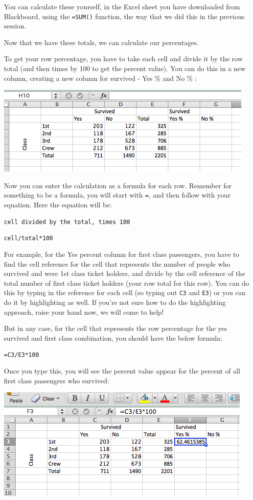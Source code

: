 \documentclass[
]{book}
\begin{document}
You can calculate these yourself, in the Excel sheet you have downloaded from Blackboard, using the \texttt{=SUM()} function, the way that we did this in the previous session.

Now that we have these totals, we can calculate our percentages.

To get your row percentage, you have to take each cell and divide it by the row total (and then times by 100 to get the percent value). You can do this in a new column, creating a new column for survived - Yes \% and No \% :

\includegraphics{imgs/surv_perc_cols.png}

Now you can enter the calculation as a formula for each row. Remember for something to be a formula, you will start with \texttt{=}, and then follow with your equation. Here the equation will be:

\texttt{cell\ divided\ by\ the\ total,\ times\ 100}

\texttt{cell/total*100}

For example, for the Yes percent column for first class passengers, you have to find the cell reference for the cell that represents the number of people who survived and were 1st class ticket holders, and divide by the cell reference of the total number of first class ticket holders (your row total for this row). You can do this by typing in the reference for each cell (so typing out \texttt{C3} and \texttt{E3}) or you can do it by highlighting as well. If you're not sure how to do the highlighting approach, raise your hand now, we will come to help!

But in any case, for the cell that represents the row percentage for the yes survived and first class combination, you should have the below formula:

\texttt{=C3/E3*100}

Once you type this, you will see the percent value appear for the percent of all first class passengers who survived:

\includegraphics{imgs/perc_surv_value.png}
\end{document}
